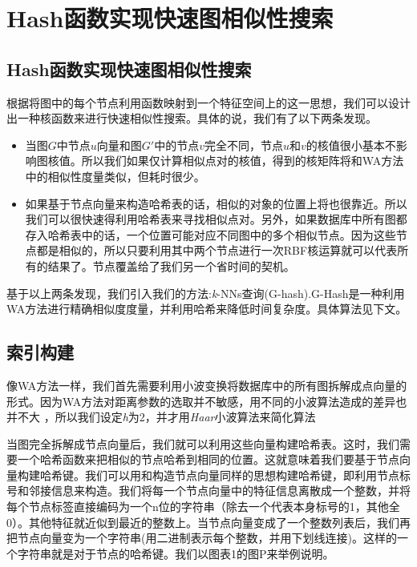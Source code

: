 \documentclass{article}
\begin{document}
\chapter{Hash函数实现快速图相似性搜索}
\else
\section{Hash函数实现快速图相似性搜索}
\fi
根据将图中的每个节点利用函数映射到一个特征空间上的这一思想，我们可以设计出一种核函数来进行快速相似性搜索。具体的说，我们有了以下两条发现。
\begin{itemize}
    \item 当图$G$中节点$u$向量和图$G'$中的节点$v$完全不同，节点$u$和$v$的核值很小基本不影响图核值。所以我们如果仅计算相似点对的核值，得到的核矩阵将和WA方法中的相似性度量类似，但耗时很少。
    \item 如果基于节点向量来构造哈希表的话，相似的对象的位置上将也很靠近。所以我们可以很快速得利用哈希表来寻找相似点对。另外，如果数据库中所有图都存入哈希表中的话，一个位置可能对应不同图中的多个相似节点。因为这些节点都是相似的，所以只要利用其中两个节点进行一次RBF核运算就可以代表所有的结果了。节点覆盖给了我们另一个省时间的契机。
\end{itemize}

基于以上两条发现，我们引入我们的方法:\emph{k}-NNs查询(G-hash).G-Hash是一种利用WA方法进行精确相似度度量，并利用哈希来降低时间复杂度。具体算法见下文。

\section{索引构建}
像WA方法一样，我们首先需要利用小波变换将数据库中的所有图拆解成点向量的形式。因为WA方法对距离参数的选取并不敏感，用不同的小波算法造成的差异也并不大\cite{Graph_wavelet} ，所以我们设定\emph{h}为2，并才用\emph{Haar}小波算法来简化算法

当图完全拆解成节点向量后，我们就可以利用这些向量构建哈希表。这时，我们需要一个哈希函数来把相似的节点哈希到相同的位置。这就意味着我们要基于节点向量构建哈希键。我们可以用和构造节点向量同样的思想构建哈希键，即利用节点标号和邻接信息来构造。我们将每一个节点向量中的特征信息离散成一个整数，并将每个节点标签直接编码为一个n位的字符串（除去一个代表本身标号的1，其他全0）。其他特征就近似到最近的整数上。当节点向量变成了一个整数列表后，我们再把节点向量变为一个字符串(用二进制表示每个整数，并用下划线连接)。这样的一个字符串就是对于节点的哈希键。我们以图表1的图P来举例说明。
\end{document}
